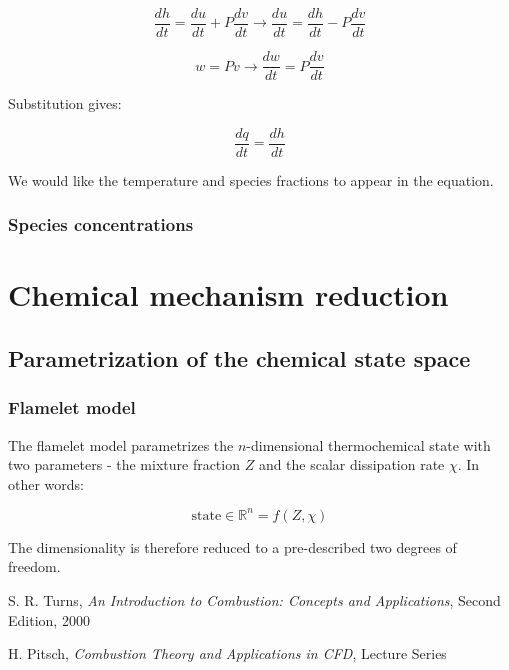 \documentclass[10pt,twocolumn]{article}
\begin{document}
\begin{equation}
\frac{dh}{dt} = \frac{du}{dt} + P \frac{dv}{dt} \rightarrow \frac{du}{dt} = \frac{dh}{dt} - P \frac{dv}{dt}
\end{equation}

\begin{equation}
w = Pv \rightarrow \frac{d w}{dt} = P \frac{dv}{dt} 
\end{equation}

Substitution gives:

\begin{equation}
\frac{dq}{dt} = \frac{dh}{dt}
\end{equation}

We would like the temperature and species fractions to appear in the equation.

\subsubsection{Species concentrations}








\section{Chemical mechanism reduction}


\subsection{Parametrization of the chemical state space}

\subsubsection{Flamelet model}

The flamelet model parametrizes the $n$-dimensional thermochemical state with two parameters - the mixture fraction $Z$ and the scalar dissipation rate $\chi$. In other words:

\begin{equation}
\text{state} \in {\mathbb{R}^n} = f(Z, \chi)
\end{equation}

The dimensionality is therefore reduced to a pre-described two degrees of freedom.



\thebibliography{}

 S. R. Turns, \textit{An Introduction to Combustion: Concepts and Applications}, Second Edition, 2000 \label{bib:turns}

 H. Pitsch, \textit{Combustion Theory and Applications in CFD}, Lecture Series \label{bib:pitsch}

\label{bib:pope}
\end{document}
